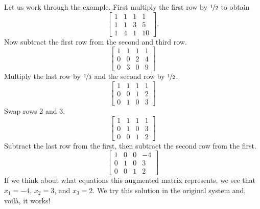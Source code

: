 \documentclass{ximera}
\begin{document}
Let us work through the example.  First multiply the first row by $\nicefrac{1}{2}$ to obtain
\begin{equation*}
    \left[
        \begin{array}{ccc|c}
            1 & 1 & 1 & 1 \\
            1 & 1 & 3 & 5 \\
            1 & 4 & 1 & 10
        \end{array}
    \right] .
\end{equation*}
Now subtract the first row from the second and third row.
\begin{equation*}
    \left[
        \begin{array}{ccc|c}
            1 & 1 & 1 & 1 \\
            0 & 0 & 2 & 4 \\
            0 & 3 & 0 & 9
        \end{array}
    \right]
\end{equation*}
Multiply the last row by $\nicefrac{1}{3}$ and the second row by $\nicefrac{1}{2}$.
\begin{equation*}
    \left[
        \begin{array}{ccc|c}
            1 & 1 & 1 & 1 \\
            0 & 0 & 1 & 2 \\
            0 & 1 & 0 & 3
        \end{array}
    \right]
\end{equation*}
Swap rows 2 and 3.
\begin{equation*}
    \left[
        \begin{array}{ccc|c}
            1 & 1 & 1 & 1 \\
            0 & 1 & 0 & 3 \\
            0 & 0 & 1 & 2
        \end{array}
    \right]
\end{equation*}
Subtract the last row from the first, then subtract the second row from the first.
\begin{equation*}
    \left[
        \begin{array}{ccc|c}
            1 & 0 & 0 & -4 \\
            0 & 1 & 0 & 3 \\
            0 & 0 & 1 & 2
        \end{array}
    \right]
\end{equation*}
If we think about what equations this augmented matrix represents, we see that $x_1 = -4$, $x_2 = 3$, and $x_3 = 2$.  We try this solution in the original system and, voil\`a, it works!
\end{document}
